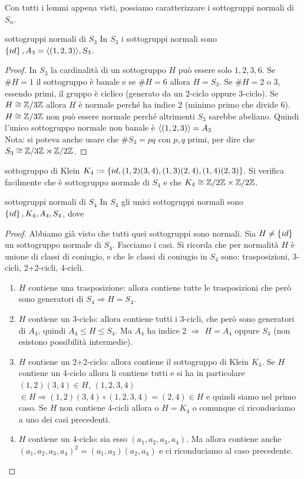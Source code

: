 Con tutti i lemmi appena visti, possiamo caratterizzare i sottogruppi normali di $S_n$.
\begin{example2}{sottogruppi normali di $S_3$}
    In $S_3$ i sottogruppi normali sono $\left\{ id \right\}, A_3 = \langle (1,2,3) \rangle, S_3$.
\end{example2}
\begin{proof}
    In $S_3$ la cardinalità di un sottogruppo $H$ può essere solo $1,2,3,6$. Se $\#H = 1$ il sottogruppo è banale e se $\#H = 6$ allora $H = S_3$. Se $\#H = 2$ o $3$, essendo primi, il gruppo è ciclico (generato da un 2-ciclo oppure 3-ciclo). Se $H \cong \mathbb{Z}/3\mathbb{Z}$ allora $H$ è normale perché ha indice 2 (minimo primo che divide 6). $H \cong \mathbb{Z}/3\mathbb{Z}$ non può essere normale perché altrimenti $S_3$ sarebbe abeliano. Quindi l'unico sottogruppo normale non banale è $\langle (1,2,3) \rangle = A_3$\\
    Nota: si poteva anche usare che $\#S_3 = pq$ con $p,q$ primi, per dire che $S_3 \cong \mathbb{Z}/3\mathbb{Z} \rtimes \mathbb{Z}/2\mathbb{Z}$.
\end{proof}
\begin{definition}{sottogruppo di Klein}
    $K_4 := \left\{ id, (1,2)(3,4), (1,3)(2,4), (1,4)(2,3) \right\}$. Si verifica facilmente che è sottogruppo normale di $S_4$ e che $K_4 \cong \mathbb{Z}/2\mathbb{Z} \times \mathbb{Z}/2\mathbb{Z}$.
\end{definition}
\begin{example2}{sottogruppi normali di $S_4$}
    In $S_4$ gli unici sottogruppi normali sono $\left\{ id \right\}, K_4, A_4, S_4$, dove 
\end{example2}
\begin{proof}
    Abbiamo già visto che tutti quei sottogruppi sono normali. Sia $H \neq \left\{ id \right\}$ un sottogruppo normale di $S_4$. Facciamo i casi. Si ricorda che per normalità $H$ è unione di classi di coniugio, e che le classi di coniugio in $S_4$ sono: trasposizioni, 3-cicli, 2+2-cicli, 4-cicli.
    \begin{enumerate}
        \item $H$ contiene una trasposizione: allora contiene tutte le trasposizioni che però sono generatori di $S_4 \Rightarrow H = S_4$. 
        \item $H$ contiene un 3-ciclo: allora contiene tutti i 3-cicli, che però sono generatori di $A_4$, quindi $A_4 \leq H \leq S_4$. Ma $A_4$ ha indice 2 $\Rightarrow$ $H = A_4$ oppure $S_4$ (non esistono possibilità intermedie).
        \item $H$ contiene un 2+2-ciclo: allora contiene il sottogruppo di Klein $K_4$. Se $H$ contiene un 4-ciclo allora li contiene tutti e si ha in particolare $(1,2)(3,4) \in H$, $(1,2,3,4)$ $\in H \Rightarrow (1,2)(3,4)\circ(1,2,3,4) = (2,4) \in H$ e quindi siamo nel primo caso. Se $H$ non contiene 4-cicli allora o $H = K_4$ o comunque ci riconduciamo a uno dei casi precedenti.
        \item $H$ contiene un 4-ciclo: sia esso $(a_1,a_2,a_3,a_4)$. Ma allora contiene anche $(a_1,a_2,a_3,a_4)^2 = (a_1,a_3)(a_2,a_4)$ e ci riconduciamo al caso precedente.
    \end{enumerate}
\end{proof}

